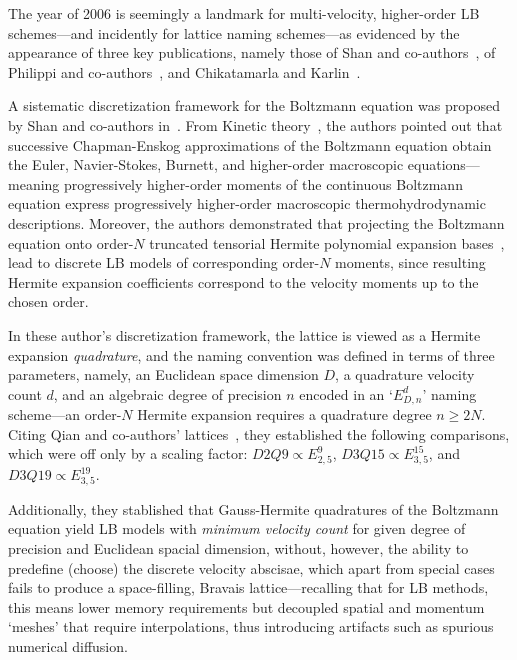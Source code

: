     The year of 2006 is seemingly a landmark for multi-velocity, higher-order LB schemes---and  incidently  for  lattice  naming
    schemes---as   evidenced   by   the   appearance   of   three   key    publications,    namely    those    of    Shan    and
    co-authors~\cite{2006-ShanX+ChenH-JFluidMech},  of  Philippi  and  co-authors~\cite{2006-PhilippiPC+SurmasR-PhysRevE},   and
    Chikatamarla and Karlin~\cite{2006-ChikatamarlaSS+KarlinIV-PhysRevLett}.

    A  sistematic  discretization   framework   for   the   Boltzmann   equation   was   proposed   by   Shan   and   co-authors
    in~\cite{2006-ShanX+ChenH-JFluidMech}.  From  Kinetic  theory~\cite{2011-HarrisS-Dover,   2003-LiboffRL-bookSpringer},   the
    authors pointed out that successive Chapman-Enskog approximations of the Boltzmann equation obtain the Euler, Navier-Stokes,
    Burnett, and higher-order macroscopic equations---meaning progressively higher-order moments  of  the  continuous  Boltzmann
    equation express progressively higher-order macroscopic thermohydrodynamic descriptions. Moreover, the authors  demonstrated
    that   projecting   the   Boltzmann   equation   onto   order-$N$   truncated   tensorial   Hermite   polynomial   expansion
    bases~\cite{1949-GradH-CommPureApplMath}, lead to discrete LB models of corresponding  order-$N$  moments,  since  resulting
    Hermite expansion coefficients correspond to the velocity moments up to the chosen order.

    In these author's discretization framework, the lattice is viewed as a Hermite expansion \emph{quadrature}, and  the  naming
    convention was defined in terms of three parameters, namely, an Euclidean space dimension $D$, a quadrature  velocity  count
    $d$, and an algebraic degree of precision $n$ encoded in an `$E_{D,n}^{d}$' naming scheme---an order-$N$  Hermite  expansion
    requires      a      quadrature      degree      $n      \geqslant      2N$.      Citing      Qian      and      co-authors'
    lattices~\cite{1992-QianYH+LallemandP-EurophysLett}, they established the following comparisons, which were off  only  by  a
    scaling factor: $D2Q9 \propto E_{2,5}^{9}$, $D3Q15 \propto E_{3,5}^{15}$, and $D3Q19 \propto E_{3,5}^{19}$.

    Additionally, they stablished that Gauss-Hermite quadratures of the Boltzmann equation yield LB  models  with  \emph{minimum
    velocity count} for given degree of precision and Euclidean spacial dimension, without, however, the  ability  to  predefine
    (choose) the discrete velocity abscisae,  which  apart  from  special  cases  fails  to  produce  a  space-filling,  Bravais
    lattice---recalling that for LB methods, this means lower memory requirements but decoupled spatial  and  momentum  `meshes'
    that require interpolations, thus introducing artifacts such as spurious numerical diffusion.


